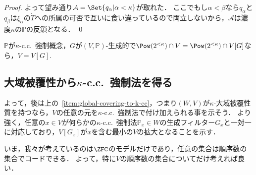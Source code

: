 \documentclass[a4j,leqno]{ltjsarticle}
\newcommand{\cc}{c.c.\ }
\begin{document}
\begin{proof}
 よって望み通り$\mathcal{A} = \Set{q_\alpha | \alpha < \kappa}$が取れた．
 ここでもし$\alpha < \beta$なら$q_\alpha$と$q_\beta$は$\xi_\alpha$の$\dot{T}$への所属の可否で互いに食い違っているので両立しないから，$\mathcal{A}$は濃度$\kappa$の$\mathbb{P}$の反鎖となる． \qed
\end{proof}

\begin{corollary}\label{cor:2<kappa-cc-tirival}
 $\mathbb{P}$が$\kappa$-\cc{}強制概念，$G$が$(V, \mathbb{P})$-生成的で$\Pow(2^{<\kappa}) \cap V = \Pow(2^{<\kappa}) \cap V[G]$なら，$V = V[G]$.
\end{corollary}

\subsection{大域被覆性から$\kappa$-\cc{}強制法を得る}
よって，後は上の~\ref{item:global-covering-to-k-cc}，つまり$(W, V)$が$\kappa$-大域被覆性質を持つなら，$V$の任意の元を$\kappa$-\cc{}強制法で付け加えられる事を示そう．
より強く，任意の$x \in V$が何らかの$\kappa$-\cc{}強制法$\mathbb{P}_x \in W$の生成フィルター$G_x$と一対一に対応しており，$V[G_x]$が$x$を含む最小の$V$の拡大となることを示す．

いま，我々が考えているのは$\ZFC$のモデルだけであり，任意の集合は順序数の集合でコードできる．
よって，特に$V$の順序数の集合についてだけ考えれば良い．
\end{document}
